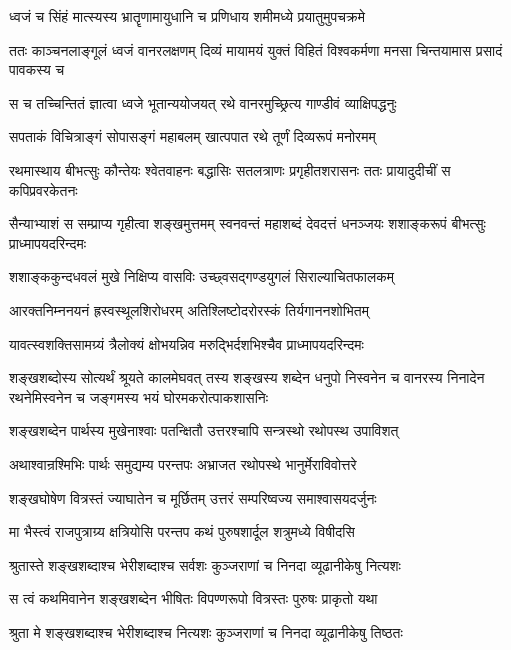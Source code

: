 \twolineshloka
{ध्वजं च सिंहं मात्स्यस्य भ्रातॄणामायुधानि च}
{प्रणिधाय शमीमध्ये प्रयातुमुपचक्रमे}


\threelineshloka
{ततः काञ्चनलाङ्गूलं ध्वजं वानरलक्षणम्}
{दिव्यं मायामयं युक्तं विहितं विश्वकर्मणा}
{मनसा चिन्तयामास प्रसादं पावकस्य च}


\twolineshloka
{स च तच्चिन्तितं ज्ञात्वा ध्वजे भूतान्ययोजयत्}
{रथे वानरमुच्छ्रित्य गाण्डीवं व्याक्षिपद्धनुः}


\twolineshloka
{सपताकं विचित्राङ्गं सोपासङ्गं महाबलम्}
{खात्पपात रथे तूर्णं दिव्यरूपं मनोरमम्}


\threelineshloka
{रथमास्थाय बीभत्सुः कौन्तेयः श्वेतवाहनः}
{बद्धासिः सतलत्राणः प्रगृहीतशरासनः}
{ततः प्रायादुदीचीं स कपिप्रवरकेतनः}


\threelineshloka
{सैन्याभ्याशं स सम्प्राप्य गृहीत्वा शङ्खमुत्तमम्}
{स्वनवन्तं महाशब्दं देवदत्तं धनञ्जयः}
{शशाङ्करूपं बीभत्सुः प्राध्मापयदरिन्दमः}


\twolineshloka
{शशाङ्ककुन्दधवलं मुखे निक्षिप्य वासविः}
{उच्छ्वसद्गण्डयुगलं सिराल्याचितफालकम्}


\twolineshloka
{आरक्तनिम्ननयनं ह्रस्वस्थूलशिरोधरम्}
{अतिश्लिष्टोदरोरस्कं तिर्यगाननशोभितम्}


\twolineshloka
{यावत्स्वशक्तिसामग्र्यं त्रैलोक्यं क्षोभयन्निव}
{मरुद्भिर्दशभिश्चैव प्राध्मापयदरिन्दमः}


\onelineshloka
{शङ्खशब्दोस्य सोत्यर्थं श्रूयते कालमेघवत्}
\threelineshloka
{तस्य शङ्खस्य शब्देन धनुपो निस्वनेन च}
{वानरस्य निनादेन रथनेमिस्वनेन च}
{जङ्गमस्य भयं घोरमकरोत्पाकशासनिः}


\twolineshloka
{शङ्खशब्देन पार्थस्य मुखेनाश्वाः पतन्क्षितौ}
{उत्तरश्चापि सन्त्रस्थो रथोपस्थ उपाविशत्}


\twolineshloka
{अथाश्वान्रश्मिभिः पार्थः समुद्यम्य परन्तपः}
{अभ्राजत रथोपस्थे भानुर्मेराविवोत्तरे}


\twolineshloka
{शङ्खघोषेण वित्रस्तं ज्याघातेन च मूर्छितम्}
{उत्तरं सम्परिष्वज्य समाश्वासयदर्जुनः}


\twolineshloka
{मा भैस्त्वं राजपुत्राग्र्य क्षत्रियोसि परन्तप}
{कथं पुरुषशार्दूल शत्रुमध्ये विषीदसि}


\twolineshloka
{श्रुतास्ते शङ्खशब्दाश्च भेरीशब्दाश्च सर्वशः}
{कुञ्जराणां च निनदा व्यूढानीकेषु नित्यशः}


\twolineshloka
{स त्वं कथमिवानेन शङ्खशब्देन भीषितः}
{विपण्णरूपो वित्रस्तः पुरुषः प्राकृतो यथा}




\twolineshloka
{श्रुता मे शङ्खशब्दाश्च भेरीशब्दाश्च नित्यशः}
{कुञ्जराणां च निनदा व्यूढानीकेषु तिष्ठतः}


